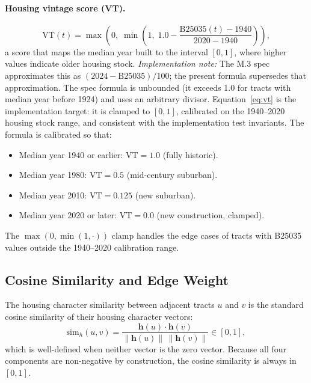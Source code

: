 \paragraph{Housing vintage score (VT).}
\begin{equation}
  \mathrm{VT}(t) = \max\!\left(0,\; \min\!\left(1,\; 1.0 - \frac{\text{B25035}(t) - 1940}{2020 - 1940}\right)\right),
  \label{eq:vt}
\end{equation}
a score that maps the median year built to the interval $[0,1]$, where higher
values indicate older housing stock.
\emph{Implementation note:} The M.3 spec approximates this as $(2024 - \text{B25035}) / 100$;
the present formula supersedes that approximation.
The spec formula is unbounded (it exceeds 1.0 for tracts with median year before 1924)
and uses an arbitrary divisor.
Equation~\eqref{eq:vt} is the implementation target: it is clamped to $[0,1]$,
calibrated on the 1940--2020 housing stock range, and consistent with the
implementation test invariants.
The formula is calibrated so that:
\begin{itemize}
  \item Median year 1940 or earlier: $\mathrm{VT} = 1.0$ (fully historic).
  \item Median year 1980: $\mathrm{VT} = 0.5$ (mid-century suburban).
  \item Median year 2010: $\mathrm{VT} = 0.125$ (new suburban).
  \item Median year 2020 or later: $\mathrm{VT} = 0.0$ (new construction, clamped).
\end{itemize}
The $\max(0, \min(1, \cdot))$ clamp handles the edge cases of tracts with
B25035 values outside the 1940--2020 calibration range.

\subsection{Cosine Similarity and Edge Weight}

The housing character similarity between adjacent tracts $u$ and $v$ is the
standard cosine similarity of their housing character vectors:
\begin{equation}
  \mathrm{sim}_h(u,v) = \frac{\mathbf{h}(u) \cdot \mathbf{h}(v)}{\|\mathbf{h}(u)\| \, \|\mathbf{h}(v)\|}
  \in [0,1],
  \label{eq:cosine}
\end{equation}
which is well-defined when neither vector is the zero vector.
Because all four components are non-negative by construction, the cosine
similarity is always in $[0,1]$.

